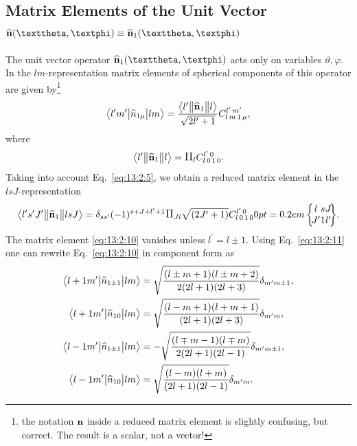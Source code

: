 \subsection{Matrix Elements of the Unit Vector \(\widehat{\vect{n}}(\vartheta, \varphi) \equiv \widehat{\vect{n}}_{1}(\vartheta, \varphi)\)}\label{sec:13.2.3}
The unit vector operator \(\widehat{\vect{n}}_{1}(\vartheta, \varphi)\) acts only on variables \(\vartheta, \varphi\). In the $lm$-representation matrix elements of spherical components of this operator are given by\footnote{the notation $\mathbf{n}$ inside a reduced matrix element is slightly confusing, but correct. The result is a scalar, not a vector!}
\begin{equation}
\bigl\langle  l^{\prime} m^{\prime} \big|  \widehat{n}_{1 \mu} \big| l m \bigr\rangle=
\frac{
\bigl\langle  l^{\prime} \big\Vert \widehat{\mathbf{n}}_{1} \big\Vert  l \bigr\rangle}{\sqrt{2 l^{\prime}+1}} 
C_{l\,m\,1\,\mu}^{l^{\prime}\,m^{\prime}}, \label{eq:13:2:10}
\end{equation}
where
\begin{equation}
\braOketred{ l^{\prime}}{\widehat{\vect{n}}_{1}}{ l}=\Fact{l} 
\clebsch{l}{0}{1}{0}{l^{\prime}}{0}. \label{eq:13:2:11}
\end{equation}
Taking into account Eq.~\eqref{eq:13:2:5}, we obtain a reduced matrix element in the \(lsJ\)-representation
\begin{equation}
\braOketred{ l^{\prime} s^{\prime} J^{\prime}}{\widehat{\vect{n}}_{1}}{ l s J}=\delta_{s s^{\prime}}(-1)^{s+J+l^{\prime}+1} \Fact{J l}\sqrt{(2 J^{\prime}+1)}
\clebsch{l}{0}{1}{0}{l^{\prime}}{0}
\sixj{l}{s}{J}{J^{\prime}}{1}{l^{\prime}}. \label{eq:13:2:12}
\end{equation}
The matrix element \eqref{eq:13:2:10} vanishes unless \(l^{\prime}=l \pm 1\). Using Eq.~\eqref{eq:13:2:11} one can rewrite Eq.~\eqref{eq:13:2:10} in component form as
\begin{align}
\bigl\langle  l+1 m^{\prime} \big|  \widehat{n}_{1 \pm 1} \big| l m \bigr\rangle & =\sqrt{\frac{(l \pm m+1)(l \pm m+2)}{2(2 l+1)(2 l+3)}} \delta_{m^{\prime} m \pm 1}, \notag\\
\bigl\langle  l+1 m^{\prime} \big|  \widehat{n}_{10} \big| l m \bigr\rangle & =\sqrt{\frac{(l-m+1)(l+m+1)}{(2 l+1)(2 l+3)}} \delta_{m^{\prime} m},  \label{eq:13:2:13}\\
\bigl\langle  l-1 m^{\prime} \big|  \widehat{n}_{1 \pm 1} \big| l m \bigr\rangle & =-\sqrt{\frac{(l \mp m-1)(l \mp m)}{2(2 l+1)(2 l-1)}} \delta_{m^{\prime} m \pm 1}, \notag \\
\bigl\langle  l-1 m^{\prime} \big|  \widehat{n}_{10} \big| l m \bigr\rangle & =\sqrt{\frac{(l-m)(l+m)}{(2 l+1)(2 l-1)}} \delta_{m^{\prime} m}. \notag
\end{align}
